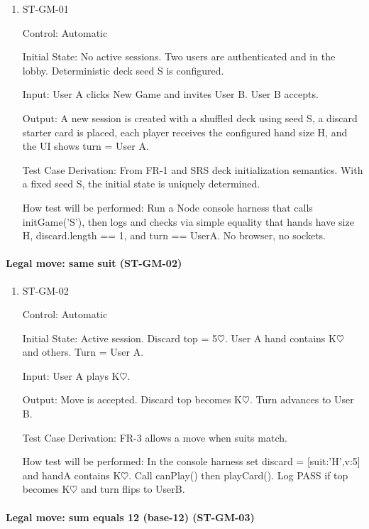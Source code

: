 \documentclass[12pt, titlepage]{article}
\begin{document}
\begin{enumerate}
\item{ST-GM-01\\}

Control: Automatic
					
Initial State: No active sessions. Two users are authenticated and in the lobby. Deterministic deck seed S is configured.
					
Input: User A clicks New Game and invites User B. User B accepts.					
					
Output: A new session is created with a shuffled deck using seed S, a discard starter card is placed, each player receives the configured hand size H, and the UI shows turn = User A.

Test Case Derivation: From FR-1 and SRS deck initialization semantics. With a fixed seed S, the initial state is uniquely determined.

How test will be performed: Run a Node console harness that calls initGame('S'), then logs and checks via simple equality that hands have size H, discard.length == 1, and turn == UserA. No browser, no sockets.
\end{enumerate}

\paragraph{Legal move: same suit (ST-GM-02)}

\begin{enumerate}
\item{ST-GM-02\\}

Control: Automatic
					
Initial State: Active session. Discard top = 5$\heartsuit$. User A hand contains K$\heartsuit$ and others. Turn = User A.
					
Input: User A plays K$\heartsuit$.
					
Output: Move is accepted. Discard top becomes K$\heartsuit$. Turn advances to User B.

Test Case Derivation: FR-3 allows a move when suits match.

How test will be performed: In the console harness set discard = [{suit:'H',v:5}] and handA contains K$\heartsuit$. Call canPlay() then playCard(). Log PASS if top becomes K$\heartsuit$ and turn flips to UserB.
\end{enumerate}

\paragraph{Legal move: sum equals 12 (base-12) (ST-GM-03)}
\end{document}

